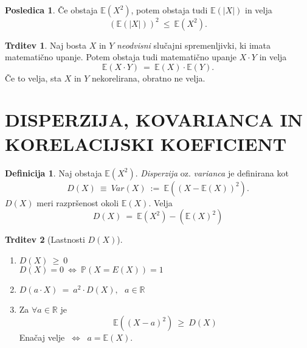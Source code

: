 \documentclass[11pt]{article}
\theoremstyle{definition}
\newtheorem{definicija}{Definicija}[section]
\theoremstyle{definition}
\newtheorem{trditev}{Trditev}[section]
\theoremstyle{definition}
\newtheorem*{posledica}{Posledica}
\begin{document}
\begin{posledica}

Če obstaja $\mathbb{E}(X^2)$, potem obstaja tudi $\mathbb{E}(|X|)$ in velja
$$(\mathbb{E}(|X|))^2 ~\leq~ \mathbb{E}(X^2).$$

\end{posledica}
\vspace{0.5cm}

\begin{trditev}

Naj bosta $X$ in $Y$ \textit{neodvisni} slučajni spremenljivki, ki imata matematično upanje. Potem obstaja tudi matematično upanje $X \cdot Y$ in velja
$$\mathbb{E}(X \cdot Y) ~=~ \mathbb{E}(X) \cdot \mathbb{E}(Y).$$
Če to velja, sta $X$ in $Y$ nekorelirana, obratno ne velja.

\end{trditev}
\vspace{0.5cm}

\pagebreak


\section{DISPERZIJA, KOVARIANCA IN KORELACIJSKI KOEFICIENT}
\vspace{0.5cm}

\begin{definicija}

Naj obstaja $\mathbb{E}(X^2)$. \textit{Disperzija} oz. \textit{varianca} je definirana kot
$$D(X) ~\equiv~ Var(X) ~:=~ \mathbb{E}((X - \mathbb{E}(X))^2).$$
$D(X)$ meri razpršenost okoli $\mathbb{E}(X)$. Velja
$$D(X) ~=~ \mathbb{E}(X^2) - (\mathbb{E}(X)^2)$$

\end{definicija}
\vspace{0.5cm}

\begin{trditev}[Lastnosti $D(X)$]
~\\
\begin{enumerate}
	\item $D(X) ~\geq~ 0$ \\
	$D(X) = 0 ~\Leftrightarrow~ \mathbb{P}(X = E(X)) = 1$
	\item $D(a \cdot X) ~=~ a^2 \cdot D(X), ~~~a \in \mathbb{R}$
	\item Za $\forall a \in \mathbb{R}$ je 
	$$\mathbb{E}((X - a)^2) ~\geq~ D(X)$$
	Enačaj velje $~\Leftrightarrow~$ $a = \mathbb{E}(X)$.
\end{enumerate}

\end{trditev}
\vspace{0.5cm}
\end{document}
